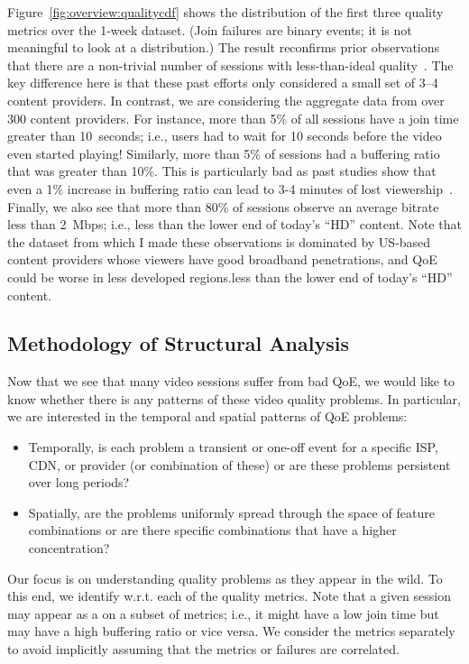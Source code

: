 Figure~\ref{fig:overview:qualitycdf} shows the distribution of the 
first three quality metrics over the 1-week dataset.  
(Join failures are binary events; it is not meaningful to look at a 
distribution.) 
The result reconfirms prior observations that there are a non-trivial 
number of sessions with less-than-ideal 
quality~\cite{sigcomm11,sigcomm12}. 
The key difference here is that  these past efforts only considered 
a small set of 3--4 content providers. 
In contrast,   we are considering the aggregate data from over 
300 content providers. 
For instance, more than 5\% of all sessions have a join time greater 
than 10~seconds; i.e., users had to wait for 10 seconds before the 
video even started playing! Similarly, more than 5\% of sessions 
had a buffering ratio that was greater than 10\%.  
This is particularly bad as past studies show that even a 1\% 
increase in buffering ratio can lead to 3-4 minutes of lost 
viewership~\cite{sigcomm11}.  
Finally, we also see that more than 80\% of sessions observe 
an average  bitrate less than 2~Mbps; 
i.e., less than the lower end of today's ``HD'' content.   
Note that the dataset from which I made these observations 
is dominated by  US-based content providers whose viewers 
have good broadband penetrations, and QoE could be worse in 
less developed regions.less than the lower end of 
today's ``HD'' content.   

\subsection{Methodology of Structural Analysis}
\label{subsec:measurement:video:method}

Now that we see that many video sessions suffer from bad QoE, 
we would like to know whether there is any patterns of these 
video quality problems.
In particular, we are interested in the temporal and spatial patterns 
of QoE problems:
\begin{itemize}
\item Temporally, is each problem a transient or one-off event for 
a specific ISP, CDN, or provider (or combination of these) or are 
these problems persistent over long periods?
\item Spatially, are the problems uniformly spread through the 
space of feature combinations or are there specific 
combinations that have a higher concentration?
\end{itemize}

Our focus  is on understanding quality problems as they appear 
in the wild. 
To this end, we identify \problemsessions w.r.t. each of the 
quality metrics. Note that a given session may appear as a 
\problemsession on a subset of  metrics; i.e., it might have a low
join time but may have a high buffering ratio or vice versa. 
We consider the  metrics separately to avoid implicitly 
assuming that the metrics or failures are correlated.

